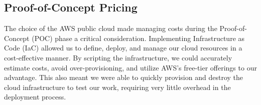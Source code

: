 \subsection{Proof-of-Concept Pricing}

The choice of the AWS public cloud made managing costs during the Proof-of-Concept (POC) phase a critical consideration. Implementing Infrastructure as Code (IaC) allowed us to define, deploy, and manage our cloud resources in a cost-effective manner. By scripting the infrastructure, we could accurately estimate costs, avoid over-provisioning, and utilize AWS's free-tier offerings to our advantage. This also meant we were able to quickly provision and destroy the cloud infrastructure to test our work, requiring very little overhead in the deployment process.
